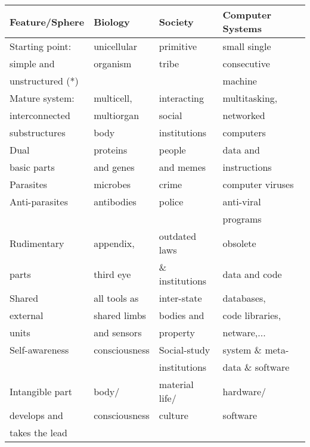 \vspace{5mm}
\begin{tabular}{|l|l|l|l|} \hline
Feature/Sphere   &  Biology  &  Society & Computer Systems \\ \hline\hline
Starting point:  & unicellular  & primitive  & small single \\
simple and & organism & tribe & consecutive \\
unstructured (*) & & & machine \\ \hline
Mature system:  & multicell,    & interacting    & multitasking,  \\
interconnected  & multiorgan    & social         & networked      \\
substructures   & body          & institutions   & computers      \\ \hline
 Dual            & proteins      & people         & data and       \\
 basic parts     & and genes     & and memes      & instructions   \\ \hline
 Parasites       & microbes      & crime          &computer viruses\\ \hline
 Anti-parasites  & antibodies    & police         & anti-viral     \\
                 &               &                & programs       \\ \hline
 Rudimentary     & appendix,     & outdated laws  & obsolete       \\
 parts           & third eye     & \& institutions & data and code  \\ \hline
 Shared          & all tools as  & inter-state    & databases,     \\
 external        & shared limbs  & bodies and     & code libraries,\\
 units           & and sensors   & property       & netware,...    \\ \hline
 Self-awareness  & consciousness & Social-study   & system \& meta- \\
                 &               & institutions   & data \& software\\ \hline
 Intangible part & body/         & material life/ & hardware/      \\
 develops and    & consciousness & culture        & software       \\
 takes the lead  &               &                &                \\ \hline
\end{tabular}

